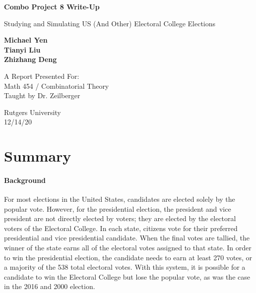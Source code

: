 \documentclass[12pt]{article}
\begin{document}
\begin{titlepage}
   \begin{center}
       \vspace*{1cm}
       
       \Huge
       \textbf{Combo Project 8 Write-Up}

       \vspace{0.5cm}
       \LARGE
        Studying and Simulating US (And Other) Electoral College Elections
            
       \vspace{1.5cm}

       \textbf{Michael Yen} \\
       \textbf{Tianyi Liu} \\
       \textbf{Zhizhang Deng} \\

       \vfill
            
       A Report Presented For:\\
       Math 454 / Combinatorial Theory\\
       Taught by Dr. Zeilberger
            
       \vspace{0.8cm}
            
       Rutgers University\\
       12/14/20
            
   \end{center}
\end{titlepage}

\section{Summary}

\paragraph{Background} For most elections in the United States, candidates are elected solely by the popular vote. However, for the presidential election, the president and vice president are not directly elected by voters; they are elected by the electoral voters of the Electoral College. In each state, citizens vote for their preferred presidential and vice presidential candidate. When the final votes are tallied, the winner of the state earns all of the electoral votes assigned to that state. In order to win the presidential election, the candidate needs to earn at least 270 votes, or a majority of the 538 total electoral votes. With this system, it is possible for a candidate to win the Electoral College but lose the popular vote, as was the case in the 2016 and 2000 election.
\end{document}
